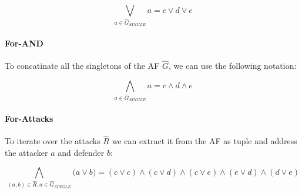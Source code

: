$$
\bigvee_{a \in \hat{G}_{\!S\!I\!N\!G\!L\!E}} a = c \lor d \lor e
$$

\paragraph{For-AND} To concatinate all the singletons of the AF $\hat{G}$, we can use the following notation:

$$
\bigwedge_{a \in \hat{G}_{\!S\!I\!N\!G\!L\!E}} a = c \land d \land e
$$

\paragraph{For-Attacks} To iterate over the attacks $\hat{R}$ we can extract it from the AF as tuple and address the attacker $a$ and defender $b$:

$$
\bigwedge_{(a, b) \in \hat{R}, a\in \hat{G}_{\!S\!I\!N\!G\!L\!E}} \big( a \lor b \big) = (c \lor c) \land
(c \lor d) \land (c \lor e) \land (e \lor d) \land (d \lor e)
$$

